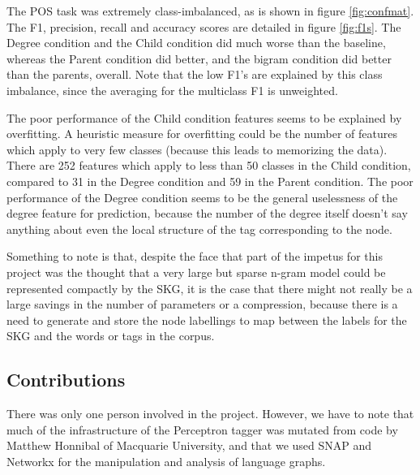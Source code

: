 \documentclass[12pt]{article}
\begin{document}
The POS task was extremely class-imbalanced, as is shown in figure \ref{fig:confmat}. The F1, precision, recall and accuracy scores are detailed in figure \ref{fig:f1s}. The Degree condition and the Child condition did much worse than the baseline, whereas the Parent condition did better, and the bigram condition did better than the parents, overall. Note that the low F1's are explained by this class imbalance, since the averaging for the multiclass F1 is unweighted.

The poor performance of the Child condition features seems to be explained by overfitting. A heuristic measure for overfitting could be the number of features which apply to very few classes (because this leads to memorizing the data). There are 252 features which apply to less than 50 classes in the Child condition, compared to 31 in the Degree condition and 59 in the Parent condition. The poor performance of the Degree condition seems to be the general uselessness of the degree feature for prediction, because the number of the degree itself doesn't say anything about even the local structure of the tag corresponding to the node.

Something to note is that, despite the face that part of the impetus for this project was the thought that a very large but sparse n-gram model could be represented compactly by the SKG, it is the case that there might not really be a large savings in the number of parameters or a compression, because there is a need to generate and store the node labellings to map between the labels for the SKG and the words or tags in the corpus.


\subsection*{Contributions}
There was only one person involved in the project. However, we have to note that much of the infrastructure of the Perceptron tagger was mutated from code by Matthew Honnibal of Macquarie University, and that we used SNAP and Networkx for the manipulation and analysis of language graphs. %

\end{document}
